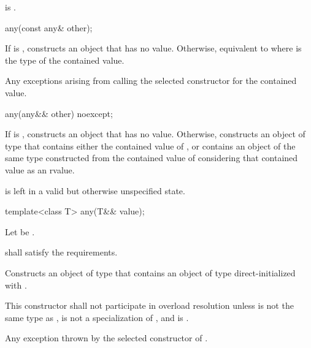 \begin{itemdescr}
\pnum
\postconditions
{} is .
\end{itemdescr}

%
\begin{itemdecl}
any(const any& other);
\end{itemdecl}

\begin{itemdescr}
\pnum
\effects
If  is , constructs an object that has no value.
Otherwise, equivalent to 
where  is the type of the contained value.

\pnum
\throws
Any exceptions arising from calling the selected constructor for the contained value.
\end{itemdescr}

%
\begin{itemdecl}
any(any&& other) noexcept;
\end{itemdecl}

\begin{itemdescr}
\pnum
\effects
If  is , constructs an object that has no value.
Otherwise, constructs an object of type  that
contains either the contained value of , or
contains an object of the same type constructed from
the contained value of  considering that contained value as an rvalue.

\pnum
\postconditions
{} is left in a valid but otherwise unspecified state.
\end{itemdescr}

%
\begin{itemdecl}
template<class T>
  any(T&& value);
\end{itemdecl}

\begin{itemdescr}
\pnum
Let  be .

\pnum
\requires
{} shall satisfy the  requirements.

\pnum
\effects
Constructs an object of type  that contains an object of type  direct-initialized with .

\pnum
\remarks
This constructor shall not participate in overload resolution unless
 is not the same type as ,
 is not a specialization of ,
and  is .

\pnum
\throws
Any exception thrown by the selected constructor of .
\end{itemdescr}

